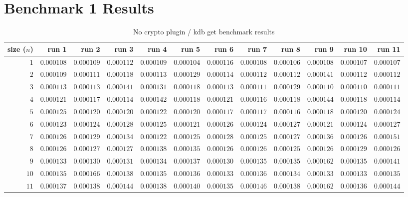 \chapter{Benchmark 1 Results}
\begin{sidewaystable} \centering \caption{No crypto plugin / kdb get benchmark results} \label{eval-table-no-crypto-get} \scriptsize \begin{tabular}{r|rrrrrrrrrrr} size ($n$) & run 1 & run 2 & run 3 & run 4 & run 5 & run 6 & run 7 & run 8 & run 9 & run 10 & run 11\\ \hline
$1$ & $0.000108$ & $0.000109$ & $0.000112$ & $0.000109$ & $0.000104$ & $0.000116$ & $0.000108$ & $0.000106$ & $0.000108$ & $0.000107$ & $0.000107$ \\
$2$ & $0.000109$ & $0.000111$ & $0.000118$ & $0.000113$ & $0.000129$ & $0.000114$ & $0.000112$ & $0.000112$ & $0.000141$ & $0.000112$ & $0.000112$ \\
$3$ & $0.000113$ & $0.000113$ & $0.000141$ & $0.000131$ & $0.000118$ & $0.000113$ & $0.000111$ & $0.000129$ & $0.000110$ & $0.000110$ & $0.000111$ \\
$4$ & $0.000121$ & $0.000117$ & $0.000114$ & $0.000142$ & $0.000118$ & $0.000121$ & $0.000116$ & $0.000118$ & $0.000144$ & $0.000118$ & $0.000114$ \\
$5$ & $0.000125$ & $0.000120$ & $0.000120$ & $0.000122$ & $0.000120$ & $0.000117$ & $0.000117$ & $0.000116$ & $0.000118$ & $0.000120$ & $0.000124$ \\
$6$ & $0.000123$ & $0.000124$ & $0.000128$ & $0.000125$ & $0.000121$ & $0.000126$ & $0.000124$ & $0.000127$ & $0.000121$ & $0.000124$ & $0.000127$ \\
$7$ & $0.000126$ & $0.000129$ & $0.000134$ & $0.000122$ & $0.000125$ & $0.000128$ & $0.000125$ & $0.000127$ & $0.000136$ & $0.000126$ & $0.000151$ \\
$8$ & $0.000126$ & $0.000127$ & $0.000127$ & $0.000138$ & $0.000135$ & $0.000126$ & $0.000126$ & $0.000125$ & $0.000126$ & $0.000129$ & $0.000126$ \\
$9$ & $0.000133$ & $0.000130$ & $0.000131$ & $0.000134$ & $0.000137$ & $0.000130$ & $0.000135$ & $0.000135$ & $0.000162$ & $0.000135$ & $0.000141$ \\
$10$ & $0.000135$ & $0.000166$ & $0.000138$ & $0.000135$ & $0.000136$ & $0.000133$ & $0.000136$ & $0.000134$ & $0.000133$ & $0.000133$ & $0.000135$ \\
$11$ & $0.000137$ & $0.000138$ & $0.000144$ & $0.000138$ & $0.000140$ & $0.000135$ & $0.000146$ & $0.000138$ & $0.000162$ & $0.000136$ & $0.000144$ \\

\end{tabular}
\end{sidewaystable}
